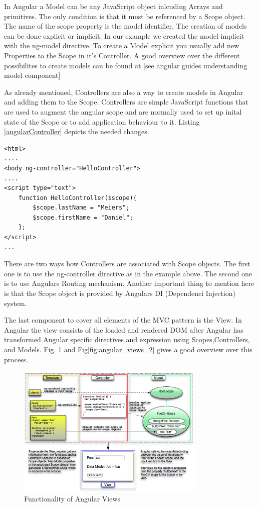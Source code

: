In Angular a Model can be any JavaScript object inlcuding Arrays and primitives. The only condition is that it must be referenced by a Scope object. The name of the scope property is the model identifier. The creation of models can be done explicit or implicit. In our example we created the model implicit with the ng-model directive. To create a Model explicit you usually add new Properties to the Scope in it's Controller. A good overview over the different possibilites to create models can be found at [see angular guides understanding model component]


As already mentioned, Controllers are also a way to create models in Angular and adding them to the Scope. Controllers are simple JavaScript functions that are used to augment the angular scope and are normally used to set up inital state of the Scope or to add application behaviour to it. Listing \ref{angularController} depicts the needed changes.

\begin{lstlisting}[label=angularController,caption=Angular Controller]
<html>
....
<body ng-controller="HelloController">
....
<script type="text">
	function HelloController($scope){
	    $scope.lastName = "Meiers";
	    $scope.firstName = "Daniel";
	};
</script>
...
\end{lstlisting}

There are two ways how Controllers are associated with Scope objects. The first one is to use the ng-controller directive as in the example above. The second one is to use Angulars Routing mechanism. Another important thing to mention here is that the Scope object is provided by Angulars DI (Dependenci Injection) system.   

The last component to cover all elements of the MVC pattern is the View. In Angular the view consists of the loaded and rendered DOM after Angular has transformed Angular specific directives and expression using Scopes,Controllers, and Models. Fig. \ref{fig:angular_views} and Fig\ref{fig:angular_views_2} gives a good overview over this process.
  
\begin{figure}
	\centering	
	\includegraphics[width=0.8\textwidth]{./img/angular_view.png}
	\caption{Functionality of Angular Views}
	\label{fig:angular_views}
\end{figure} 

